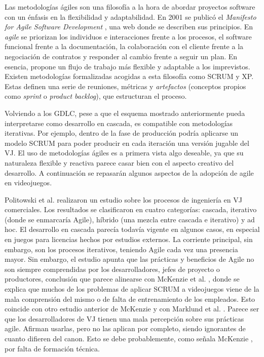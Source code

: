 Las metodologías ágiles son una filosofía a la hora de abordar proyectos software con un énfasis en la flexibilidad y adaptabilidad. En 2001 se publicó el \textit{Manifesto for Agile Software Development} \cite{agile-manifesto}, una web donde se describen sus principios. En \textit{agile} se priorizan los individuos e interacciones frente a los procesos, el software funcional frente a la documentación, la colaboración con el cliente frente a la negociación de contratos y responder al cambio frente a seguir un plan.  En esencia, propone un flujo de trabajo más flexible y adaptable a los imprevistos. Existen metodologías formalizadas acogidas a esta filosofía como SCRUM y XP. Estas definen una serie de reuniones, métricas y \textit{artefactos} (conceptos propios como \textit{sprint} o \textit{product backlog}), que estructuran el proceso.

Volviendo a los GDLC, pese a que el esquema mostrado anteriormente pueda interpretarse como desarrollo en cascada, es compatible con metodologías iterativas. Por ejemplo, dentro de la fase de producción podría aplicarse un modelo SCRUM para poder producir en cada iteración una versión jugable del VJ. El uso de metodologías ágiles es a primera vista algo deseable, ya que su naturaleza flexible y reactiva parece casar bien con el aspecto creativo del desarrollo. A continuación se repasarán algunos aspectos de la adopción de agile en videojuegos.

Politowski et al. \cite{politowski} realizaron un estudio sobre los procesos de ingeniería en VJ comerciales. Los resultados se clasificaron en cuatro categorías: cascada, iterativo (donde se enmarcaría Agile), híbrido (una mezcla entre cascada e iterativo) y ad hoc. El desarrollo en cascada parecía todavía vigente en algunos casos, en especial en juegos para licencias hechos por estudios externos. La corriente principal, sin embargo, son los procesos iterativos, teniendo Agile cada vez una presencia mayor. Sin embargo, el estudio apunta que las prácticas y beneficios de Agile no son siempre comprendidas por los desarrolladores, jefes de proyecto o productores, conclusión que parece alinearse con McKenzie et al. \cite{mckenzie}, donde se explica que muchos de los problemas de aplicar SCRUM a videojuegos viene de la mala comprensión del mismo o de falta de entrenamiento de los empleados. Esto coincide con otro estudio anterior de McKenzie \cite{mckenzie2} y con Marklund et al. \cite{marklund}. Parece ser que los desarrolladores de VJ tienen una mala percepción sobre sus prácticas agile. Afirman usarlas, pero no las aplican por completo, siendo ignorantes de cuanto difieren del canon. Esto se debe probablemente, como señala McKenzie \cite{mckenzie}, por falta de formación técnica.

